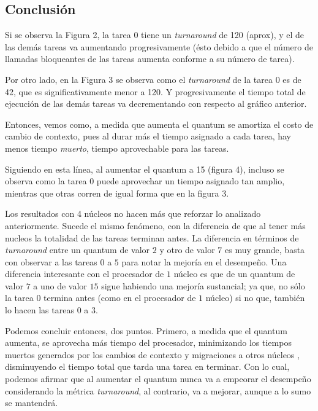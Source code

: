 \documentclass[a4paper]{article}
\begin{document}
\newpage
\subsection{Conclusión}

Si se observa la Figura 2, la tarea $0$ tiene un \textit{turnaround} de 120
(aprox), y el de las demás tareas va aumentando progresivamente (ésto debido
a que el número de llamadas bloqueantes de las tareas aumenta conforme a su
número de tarea).

Por otro lado, en la Figura 3 se observa como el \textit{turnaround} de la
tarea $0$ es de 42, que es significativamente menor a 120. Y progresivamente
el tiempo total de ejecución de las demás tareas va decrementando con respecto
al gráfico anterior.

Entonces, vemos como, a medida que aumenta el quantum se amortiza el costo
de cambio de contexto, pues al durar más el tiempo asignado a cada tarea,
hay menos tiempo \textit{muerto}, tiempo aprovechable para las tareas.

Siguiendo en esta línea, al aumentar el quantum a 15 (figura 4), incluso se observa
como la tarea $0$ puede aprovechar un tiempo asignado tan amplio,
mientras que otras corren de igual forma que en la figura 3.

Los resultados con 4 núcleos no hacen más que reforzar lo analizado
anteriormente. Sucede el mismo fenómeno, con la diferencia de que al tener más
nucleos la totalidad de las tareas terminan antes. La diferencia en términos
de \textit{turnaround} entre un quantum de valor $2$ y otro de valor $7$ es
muy grande, basta con observar a las tareas $0$ a $5$ para notar la mejoría en
el desempeño. Una diferencia interesante con el procesador de $1$ núcleo es
que de un quantum de valor $7$ a uno de valor $15$ sigue habiendo una
mejoría sustancial; ya que, no sólo la tarea $0$ termina antes (como en el
procesador de $1$ núcleo) si no que, también lo hacen las tareas $0$ a $3$.

Podemos concluir entonces, dos puntos. Primero, a medida que el quantum
aumenta, se aprovecha más tiempo del procesador, minimizando los tiempos
muertos generados por los cambios de contexto y migraciones a otros núcleos
, disminuyendo el tiempo total que tarda una tarea en terminar.
Con lo cual, podemos afirmar que al aumentar el quantum nunca va a empeorar 
el desempeño considerando la métrica \textit{turnaround}, al contrario,
va a mejorar, aunque a lo sumo se mantendrá.
\end{document}
